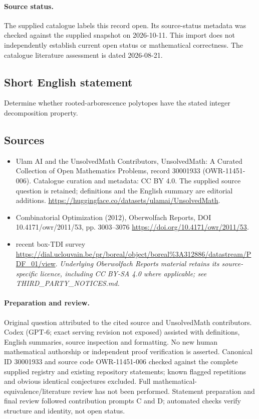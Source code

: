 \documentclass[11pt]{article}
\begin{document}
\paragraph{Source status.}
The supplied catalogue labels this record open. Its source-status metadata was checked against the supplied snapshot on 2026-10-11. This import does not independently establish current open status or mathematical correctness. The catalogue literature assessment is dated 2026-08-21.
\subsection{Short English statement}
Determine whether rooted-arborescence polytopes have the stated integer decomposition property.
\subsection{Sources}
\begin{itemize}
\item[S1] Ulam AI and the UnsolvedMath Contributors, UnsolvedMath: A Curated Collection of Open Mathematics Problems, record 30001933 (OWR-11451-006). Catalogue curation and metadata: CC BY 4.0. The supplied source question is retained; definitions and the English summary are editorial additions.
\url{https://huggingface.co/datasets/ulamai/UnsolvedMath}.
\item[S2] Combinatorial Optimization (2012), Oberwolfach Reports, DOI 10.4171/owr/2011/53, pp. 3003--3076
\url{https://doi.org/10.4171/owr/2011/53}.
\item[S3] recent box-TDI survey
\url{https://dial.uclouvain.be/pr/boreal/object/boreal%3A312886/datastream/PDF_01/view}.
\textit{Underlying Oberwolfach Reports material retains its source-specific licence, including CC BY-SA 4.0 where applicable; see THIRD\_PARTY\_NOTICES.md.}
\end{itemize}
\paragraph{Preparation and review.}
Original question attributed to the cited source and UnsolvedMath contributors. Codex (GPT-6; exact serving revision not exposed) assisted with definitions, English summaries, source inspection and formatting. No new human mathematical authorship or independent proof verification is asserted. Canonical ID 30001933 and source code OWR-11451-006 checked against the complete supplied registry and existing repository statements; known flagged repetitions and obvious identical conjectures excluded. Full mathematical-equivalence/literature review has not been performed. Statement preparation and final review followed contribution prompts C and D; automated checks verify structure and identity, not open status.
\label{end:30001933}
\end{document}
